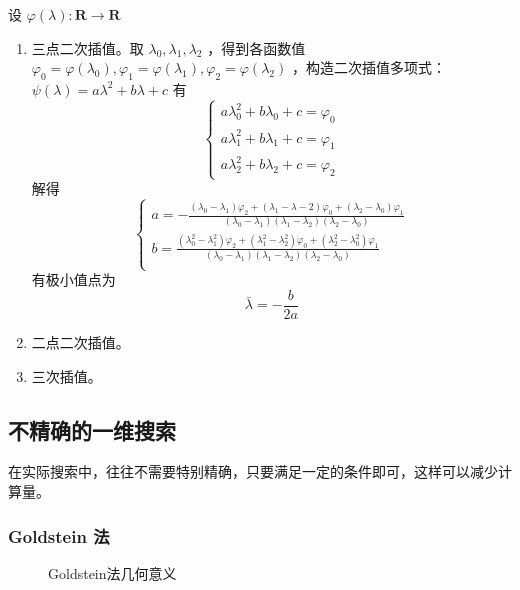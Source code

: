\documentclass{book}
\begin{document}
设 $\varphi(\lambda):\mathbf{R}\rightarrow \mathbf{R}$
\begin{enumerate}
    \item 三点二次插值。取 $\lambda_0,\lambda_1,\lambda_2$ ，得到各函数值 $\varphi_0=\varphi(\lambda_0), \varphi_1=\varphi(\lambda_1),\varphi_2=\varphi(\lambda_2)$ ，构造二次插值多项式：$\psi (\lambda)=a\lambda^2+b\lambda+c$ 有
          $$\begin{cases}
                  a\lambda_0^2+b\lambda_0+c=\varphi_0 \\
                  a\lambda_1^2+b\lambda_1+c=\varphi_1 \\
                  a\lambda_2^2+b\lambda_2+c=\varphi_2
              \end{cases}$$
          解得
          $$\begin{cases}
                  a=-\frac{(\lambda_0-\lambda_1)\varphi_2+(\lambda_1-\lambda-2)\varphi_0+(\lambda_2-\lambda_0)\varphi_1}{(\lambda_0-\lambda_1)(\lambda_1-\lambda_2)(\lambda_2-\lambda_0)}            \\
                  b=\frac{(\lambda_0^2-\lambda_1^2)\varphi_2+(\lambda_1^2-\lambda_2^2)\varphi_0+(\lambda_2^2-\lambda_0^2)\varphi_1}{(\lambda_0-\lambda_1)(\lambda_1-\lambda_2)(\lambda_2-\lambda_0)} \\
              \end{cases}$$
          有极小值点为 $$\bar{\lambda}=-\frac{b}{2a}$$
    \item 二点二次插值。
    \item 三次插值。
\end{enumerate}

\subsection{不精确的一维搜索}

在实际搜索中，往往不需要特别精确，只要满足一定的条件即可，这样可以减少计算量。

\subsubsection{Goldstein 法}

\begin{figure}[ht]
    \centering
    
    \caption{Goldstein法几何意义}
    \label{fig:Axis of Goldstein method}
\end{figure}
\end{document}
